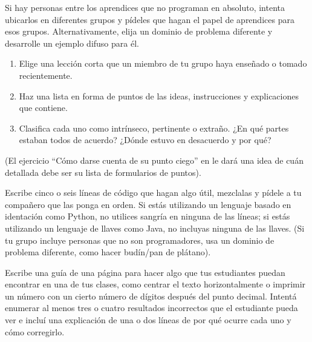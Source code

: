 Si hay personas entre los aprendices que no programan en absoluto, 
intenta ubicarlos en diferentes grupos 
y pídeles que hagan el papel de aprendices para esos grupos. 
Alternativamente, 
elija un dominio de problema diferente y desarrolle un ejemplo difuso para él.



\begin{enumerate}

\item
  Elige una lección corta que un miembro de tu grupo haya enseñado o tomado recientemente.

\item
  Haz una lista en forma de puntos de las ideas, instrucciones y explicaciones que contiene.

\item
  Clasifica cada uno como intrínseco, pertinente o extraño.
  ¿En qué partes estaban todos de acuerdo?
  ¿Dónde estuvo en desacuerdo y por qué?

\end{enumerate}

(El ejercicio ``Cómo darse cuenta de su punto ciego'' en 
le dará una idea de cuán detallada debe ser su lista de formularios de puntos).



Escribe cinco o seis líneas de código que hagan algo útil, 
mezclalas y pídele a tu compañero que las ponga en orden. 
Si estás utilizando un lenguaje basado en identación como Python, 
no utilices sangría en ninguna de las líneas; 
si estás utilizando un lenguaje de llaves como Java, 
no incluyas ninguna de las llaves. 
(Si tu grupo incluye personas que no son programadores, 
usa un dominio de problema diferente, 
como hacer budín/pan de plátano).



Escribe una guía de una página para hacer algo que tus estudiantes puedan encontrar en una de tus clases, 
como centrar el texto horizontalmente 
o imprimir un número con un cierto número de dígitos después del punto decimal. 
Intentá enumerar al menos tres o cuatro resultados incorrectos que el estudiante pueda ver 
e incluí una explicación de una o dos líneas 
de por qué ocurre cada uno y cómo corregirlo.



